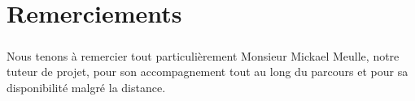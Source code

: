 \section*{Remerciements}
\subparagraph{}
Nous tenons \`a remercier tout particuli\`erement Monsieur Mickael Meulle, notre tuteur de projet, pour son accompagnement tout au long du parcours et pour sa disponibilit\'e malgr\'e la distance.
